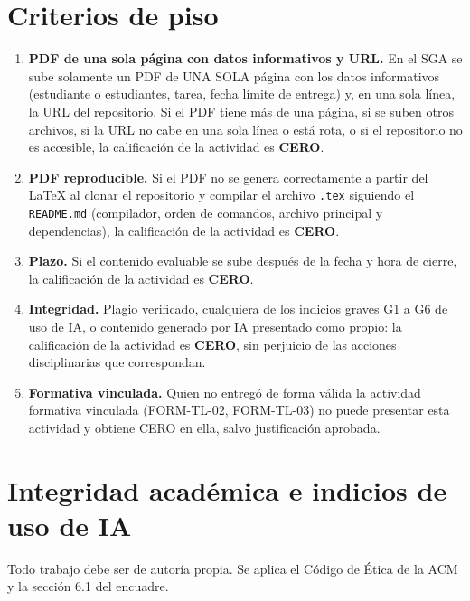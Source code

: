 \documentclass[11pt]{article}
\newcommand{\seccion}[1]{\section{\textcolor{utegreendk}{#1}}}
\begin{document}
\seccion{Criterios de piso}

\begin{cajapiso}[title={Criterios de piso: su incumplimiento implica calificación CERO en la actividad}]
	\begin{enumerate}[label=\textbf{P\arabic*.},leftmargin=24pt,itemsep=3pt]
		\item \textbf{PDF de una sola página con datos informativos y URL.} En el SGA se sube solamente un PDF de UNA SOLA página con los datos informativos (estudiante o estudiantes, tarea, fecha límite de entrega) y, en una sola línea, la URL del repositorio. Si el PDF tiene más de una página, si se suben otros archivos, si la URL no cabe en una sola línea o está rota, o si el repositorio no es accesible, la calificación de la actividad es \textbf{CERO}.
		\item \textbf{PDF reproducible.} Si el PDF no se genera correctamente a partir del \LaTeX{} al clonar el repositorio y compilar el archivo \texttt{.tex} siguiendo el \texttt{README.md} (compilador, orden de comandos, archivo principal y dependencias), la calificación de la actividad es \textbf{CERO}.
		\item \textbf{Plazo.} Si el contenido evaluable se sube después de la fecha y hora de cierre, la calificación de la actividad es \textbf{CERO}.
		\item \textbf{Integridad.} Plagio verificado, cualquiera de los indicios graves G1 a G6 de uso de IA, o contenido generado por IA presentado como propio: la calificación de la actividad es \textbf{CERO}, sin perjuicio de las acciones disciplinarias que correspondan.
		\item \textbf{Formativa vinculada.} Quien no entregó de forma válida la actividad formativa vinculada (FORM-TL-02, FORM-TL-03) no puede presentar esta actividad y obtiene CERO en ella, salvo justificación aprobada.
	\end{enumerate}
\end{cajapiso}

\seccion{Integridad académica e indicios de uso de IA}

Todo trabajo debe ser de autoría propia. Se aplica el Código de Ética de la ACM \citep{acm_code_2018} y la sección 6.1 del encuadre.
\end{document}

